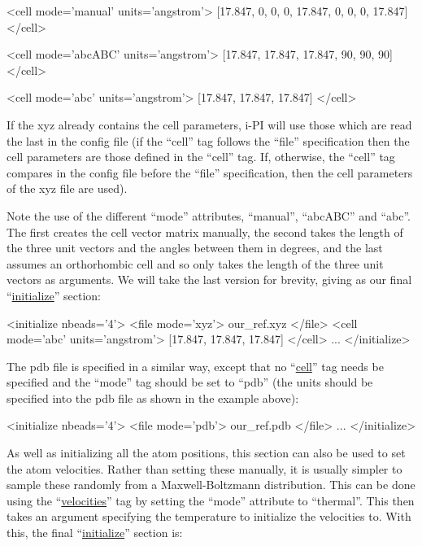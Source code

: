 \documentclass[11pt,english,fleqn]{report}
\newenvironment{code}{%
\footnotesize 
\verbatim
}{
\endverbatim
\normalsize
}
\begin{document}
\begin{code}
<cell mode='manual' units='angstrom'> 
   [17.847, 0, 0, 0, 17.847, 0, 0, 0, 17.847] 
</cell>
\end{code}

\begin{code}
<cell mode='abcABC' units='angstrom'>
   [17.847, 17.847, 17.847, 90, 90, 90]
</cell>
\end{code}

\begin{code}
<cell mode='abc' units='angstrom'>
   [17.847, 17.847, 17.847]
</cell>
\end{code}

If the xyz already contains the cell parameters, i-PI will use those
which are read the last in the config file (if the {}``cell'' tag
follows the {}``file'' specification then the cell parameters are those
defined in the {}``cell'' tag. If, otherwise, the {}``cell'' tag
compares in the config file before the {}``file'' specification, then
the cell parameters of the xyz file are used).

Note the use of the different {}``mode'' attributes, {}``manual'',
{}``abcABC'' and {}``abc''. The first creates the cell vector
matrix manually, the second takes the length of the three unit vectors
and the angles between them in degrees, and the last assumes an orthorhombic
cell and so only takes the length of the three unit vectors as arguments.
We will take the last version for brevity, giving as our final 
{}``\hyperref[INITIALIZER]{initialize}'' section:

\begin{code}
<initialize nbeads='4'>
   <file mode='xyz'> our_ref.xyz </file>
   <cell mode='abc' units='angstrom'>
      [17.847, 17.847, 17.847]
   </cell>
   ...
</initialize>
\end{code}

The pdb file is specified in a similar way, except that no 
{}``\hyperref[INITCELL]{cell}''
tag needs be specified and the {}``mode'' tag should be
set to {}``pdb'' (the units should be specified into the pdb file as
shown in the example above):

\begin{code}
<initialize nbeads='4'>
   <file mode='pdb'> our_ref.pdb </file>
   ...
</initialize>
\end{code}

As well as initializing all the atom positions, this section
can also be used to set the atom velocities. Rather than setting these manually,
it is usually simpler to sample these randomly from a Maxwell-Boltzmann
distribution. This can be done using the 
{}``\hyperref[INITVELOCITIES]{velocities}'' 
tag by setting the {}``mode'' attribute to {}``thermal''.
This then takes an argument specifying the temperature to initialize the
velocities to. With this, the final 
{}``\hyperref[INITIALIZER]{initialize}'' section is:
\end{document}
